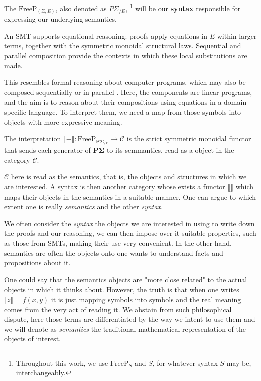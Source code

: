 The $\text{FreeP}_{(\Sigma,E)}$, also denoted as $P\Sigma_{/E}$,
\footnote{Throughout this work, we use $\text{FreeP}_{S}$ and $S$, for
	whatever syntax $S$ may be, interchangeably.}
will be our \textbf{syntax} responsible for expressing our underlying semantics.

An SMT supports equational reasoning: proofs apply equations in $E$ within
larger terms, together with the symmetric monoidal structural laws.
Sequential and parallel composition provide the contexts in which these
local substitutions are made.

This resembles formal reasoning about computer programs, which may also be
composed sequentially or in parallel
\cite{winskel1993formal,piedeleu2023introductionstringdiagramscomputer}.
Here, the components are linear programs, and the aim is to reason about their
compositions using equations in a domain-specific language. To interpret them,
we need a map from those symbols into objects with more expressive meaning.
 
 
\begin{definition}[Interpretation]\label{def:glp-interpretation}
    The interpretation
    $\llbracket{-}\rrbracket:\mathrm{FreeP}_{\mathbf{P\Sigma_{/E}}}\to\mathcal{C}$
    is the strict symmetric monoidal functor that sends each
    generator of $\mathbf{P\Sigma}$ to its semmantics, read as a
    object in the category $\mathcal{C}$.
\end{definition}

$\mathcal{C}$ here is read as the semantics, that is, the objects and structures
in which we are interested. A syntax is then another category whose exists a 
functor $\llbracket \rrbracket$ which maps their objects in the semantics in a suitable
manner. One can argue to which extent one is really \textit{semantics} and
the other \textit{syntax}.

We often consider the \textit{syntax} the objects we are interested in using to
write down the proofs and our reasoning,
we can then impose over it suitable properties, such as those from SMTs, making
their use very convenient. In the other hand, semantics are often the objects
onto one wants to understand facts and propositions about it.

One could say that the semantics
objects are "more close related" to the actual objects in which it thinks about.
However, the truth is that when one writes $\llbracket z \rrbracket = f(x,y)$ it is just
mapping symbols into symbols and the real meaning comes from the very act of reading it.
We abstain from such philosophical dispute, here those terms
are differentiated by the way we intent to use them and we will denote as \textit{semantics}
the traditional mathematical representation of the objects of interest.

